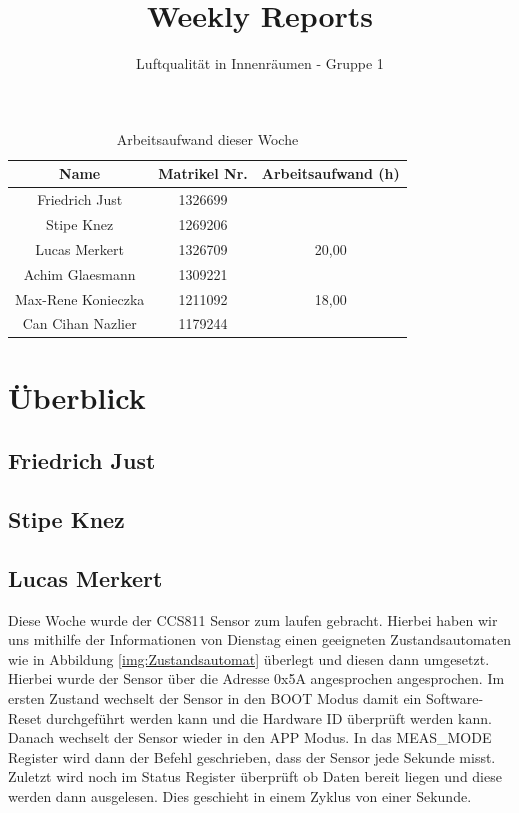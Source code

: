 \documentclass[]{article}
\title{Weekly Reports}
\author{Luftqualität in Innenräumen - Gruppe 1}
\begin{document}
\maketitle

\begin{table}[h!]
	\centering
	\begin{tabular}{|c|c|c|}
		\hline
		{\textbf{Name}}				&		{\textbf{Matrikel Nr.}} & {\textbf{Arbeitsaufwand (h)}} \\
		\hline
		Friedrich Just				&		1326699 				&		\\
		\hline
		Stipe Knez				&		1269206 				&	\\
		\hline
		Lucas Merkert				&		1326709					&	20,00	\\
		\hline
		Achim Glaesmann				&		1309221					&		\\
		\hline
		Max-Rene Konieczka			&		1211092					&	18,00	\\
		\hline
		Can Cihan Nazlier			&		1179244					&		\\
		\hline
	\end{tabular}
	\caption{Arbeitsaufwand dieser Woche}
	\label{tab:worakload}
\end{table}



\section{Überblick}


\subsection{Friedrich Just}



\subsection{Stipe Knez}

\subsection{Lucas Merkert}
Diese Woche wurde der CCS811 Sensor zum laufen gebracht. Hierbei haben wir uns mithilfe der Informationen von Dienstag einen geeigneten Zustandsautomaten wie in Abbildung \ref{img:Zustandsautomat} überlegt und diesen dann umgesetzt. Hierbei wurde der Sensor über die Adresse 0x5A angesprochen angesprochen. Im ersten Zustand wechselt der Sensor in den BOOT Modus damit ein Software-Reset durchgeführt werden kann und die Hardware ID überprüft werden kann. Danach wechselt der Sensor wieder in den APP Modus. In das MEAS\_MODE Register wird dann der Befehl geschrieben, dass der Sensor jede Sekunde misst. Zuletzt wird noch im Status Register überprüft ob Daten bereit liegen und diese werden dann ausgelesen. Dies geschieht in einem Zyklus von einer Sekunde.
\end{document}
